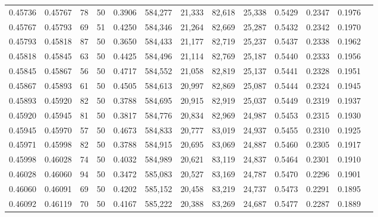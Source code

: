 \begin{tabular}{rrrrrrrrrrrrr}
0.45736 & 0.45767 &    78 &  50 &                                     0.3906 & 584,277 &  21,333 &  82,618 &  25,338 & 0.5429 & 0.2347 & 0.1976 \\
0.45767 & 0.45793 &    69 &  51 &                                     0.4250 & 584,346 &  21,264 &  82,669 &  25,287 & 0.5432 & 0.2342 & 0.1970 \\
0.45793 & 0.45818 &    87 &  50 &                                     0.3650 & 584,433 &  21,177 &  82,719 &  25,237 & 0.5437 & 0.2338 & 0.1962 \\
0.45818 & 0.45845 &    63 &  50 &                                     0.4425 & 584,496 &  21,114 &  82,769 &  25,187 & 0.5440 & 0.2333 & 0.1956 \\
0.45845 & 0.45867 &    56 &  50 &                                     0.4717 & 584,552 &  21,058 &  82,819 &  25,137 & 0.5441 & 0.2328 & 0.1951 \\
0.45867 & 0.45893 &    61 &  50 &                                     0.4505 & 584,613 &  20,997 &  82,869 &  25,087 & 0.5444 & 0.2324 & 0.1945 \\
0.45893 & 0.45920 &    82 &  50 &                                     0.3788 & 584,695 &  20,915 &  82,919 &  25,037 & 0.5449 & 0.2319 & 0.1937 \\
0.45920 & 0.45945 &    81 &  50 &                                     0.3817 & 584,776 &  20,834 &  82,969 &  24,987 & 0.5453 & 0.2315 & 0.1930 \\
0.45945 & 0.45970 &    57 &  50 &                                     0.4673 & 584,833 &  20,777 &  83,019 &  24,937 & 0.5455 & 0.2310 & 0.1925 \\
0.45971 & 0.45998 &    82 &  50 &                                     0.3788 & 584,915 &  20,695 &  83,069 &  24,887 & 0.5460 & 0.2305 & 0.1917 \\
0.45998 & 0.46028 &    74 &  50 &                                     0.4032 & 584,989 &  20,621 &  83,119 &  24,837 & 0.5464 & 0.2301 & 0.1910 \\
0.46028 & 0.46060 &    94 &  50 &                                     0.3472 & 585,083 &  20,527 &  83,169 &  24,787 & 0.5470 & 0.2296 & 0.1901 \\
0.46060 & 0.46091 &    69 &  50 &                                     0.4202 & 585,152 &  20,458 &  83,219 &  24,737 & 0.5473 & 0.2291 & 0.1895 \\
0.46092 & 0.46119 &    70 &  50 &                                     0.4167 & 585,222 &  20,388 &  83,269 &  24,687 & 0.5477 & 0.2287 & 0.1889 \\

\end{tabular}
